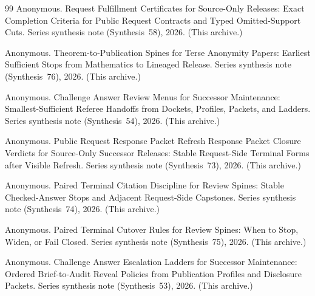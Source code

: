 \documentclass[11pt]{article}
\begin{document}
\begin{thebibliography}{99}
Anonymous.
\newblock Request Fulfillment Certificates for Source-Only Releases: Exact Completion Criteria for Public Request Contracts and Typed Omitted-Support Cuts.
\newblock Series synthesis note (Synthesis~58), 2026. (This archive.)




Anonymous.
\newblock Theorem-to-Publication Spines for Terse Anonymity Papers: Earliest Sufficient Stops from Mathematics to Lineaged Release.
\newblock Series synthesis note (Synthesis~76), 2026. (This archive.)

Anonymous.
\newblock Challenge Answer Review Menus for Successor Maintenance: Smallest-Sufficient Referee Handoffs from Dockets, Profiles, Packets, and Ladders.
\newblock Series synthesis note (Synthesis~54), 2026. (This archive.)

Anonymous.
\newblock Public Request Response Packet Refresh Response Packet Closure Verdicts for Source-Only Successor Releases: Stable Request-Side Terminal Forms after Visible Refresh.
\newblock Series synthesis note (Synthesis~73), 2026. (This archive.)

Anonymous.
\newblock Paired Terminal Citation Discipline for Review Spines: Stable Checked-Answer Stops and Adjacent Request-Side Capstones.
\newblock Series synthesis note (Synthesis~74), 2026. (This archive.)

Anonymous.
\newblock Paired Terminal Cutover Rules for Review Spines: When to Stop, Widen, or Fail Closed.
\newblock Series synthesis note (Synthesis~75), 2026. (This archive.)



Anonymous.
\newblock Challenge Answer Escalation Ladders for Successor Maintenance: Ordered Brief-to-Audit Reveal Policies from Publication Profiles and Disclosure Packets.
\newblock Series synthesis note (Synthesis~53), 2026. (This archive.)

\end{thebibliography}
\end{document}
